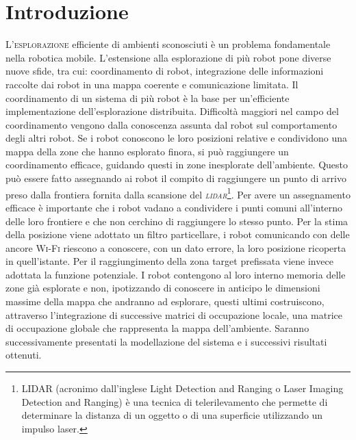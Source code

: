 \section{Introduzione}
\lettrine[lines=3]{L'}{esplorazione} efficiente di ambienti sconosciuti è un
problema fondamentale nella robotica mobile.
L'estensione alla esplorazione di più robot pone diverse nuove sfide, tra cui:
coordinamento di robot, integrazione delle informazioni raccolte dai robot in
una mappa coerente e comunicazione limitata.
Il coordinamento di un sistema di più robot è la base per un'efficiente
implementazione dell'esplorazione distribuita.
Difficoltà maggiori nel campo del coordinamento vengono dalla conoscenza
assunta dal robot sul comportamento degli altri robot.
Se i robot conoscono le loro posizioni relative e condividono una mappa della
zone che hanno esplorato finora, si può raggiungere un coordinamento efficace,
guidando questi in zone inesplorate dell'ambiente.
Questo può essere fatto assegnando ai robot il compito di raggiungere un punto
di arrivo preso dalla frontiera fornita dalla scansione del
\emph{\textsc{lidar}}\footnote{LIDAR (acronimo dall'inglese Light Detection and
Ranging o Laser Imaging Detection and Ranging) è una tecnica di
telerilevamento che permette di determinare la distanza di un oggetto o di una
superficie utilizzando un impulso laser.}.\cite{yamauchi1998frontier}
Per avere un assegnamento efficace è importante che i robot vadano a condividere
i punti comuni all'interno delle loro frontiere e che non cerchino di
raggiungere lo stesso punto.
Per la stima della posizione viene adottato un filtro particellare, i robot
comunicando con delle ancore \textsc{Wi-Fi} riescono a conoscere, con un dato
errore, la loro posizione ricoperta in quell'istante. Per il raggiungimento
della zona target prefissata viene invece adottata la funzione potenziale.
I robot contengono al loro interno memoria delle zone già esplorate e non,
ipotizzando di conoscere in anticipo le dimensioni massime della mappa che
andranno ad esplorare, questi ultimi costruiscono, attraverso l'integrazione di
successive matrici di occupazione locale, una matrice di occupazione globale
che rappresenta la mappa dell'ambiente.
Saranno successivamente presentati la modellazione del sistema e i successivi
risultati ottenuti.
